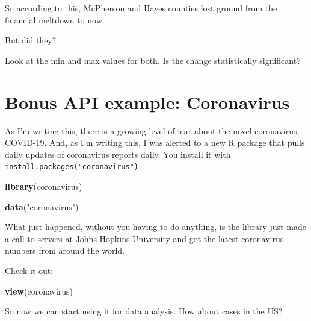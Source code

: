 \documentclass[]{book}
\newenvironment{Shaded}{\begin{snugshade}}{\end{snugshade}}
\newcommand{\KeywordTok}[1]{\textcolor[rgb]{0.13,0.29,0.53}{\textbf{#1}}}
\newcommand{\NormalTok}[1]{#1}
\newcommand{\OperatorTok}[1]{\textcolor[rgb]{0.81,0.36,0.00}{\textbf{#1}}}
\newcommand{\StringTok}[1]{\textcolor[rgb]{0.31,0.60,0.02}{#1}}
\begin{document}
So according to this, McPherson and Hayes counties lost ground from the financial meltdown to now.

But did they?

Look at the min and max values for both. Is the change statistically significant?

\hypertarget{bonus-api-example-coronavirus}{%
\section{Bonus API example: Coronavirus}\label{bonus-api-example-coronavirus}}

As I'm writing this, there is a growing level of fear about the novel coronavirus, COVID-19. And, as I'm writing this, I was alerted to a new R package that pulls daily updates of coronavirus reports daily. You install it with \texttt{install.packages("coronavirus")}

\begin{Shaded}
\begin{Highlighting}[]
\KeywordTok{library}\NormalTok{(coronavirus)}

\KeywordTok{data}\NormalTok{(}\StringTok{"coronavirus"}\NormalTok{) }
\end{Highlighting}
\end{Shaded}

What just happened, without you having to do anything, is the library just made a call to servers at Johns Hopkins University and got the latest coronavirus numbers from around the world.

Check it out:

\begin{Shaded}
\begin{Highlighting}[]
\KeywordTok{view}\NormalTok{(coronavirus)}
\end{Highlighting}
\end{Shaded}

So now we can start using it for data analysis. How about cases in the US?

\begin{Shaded}
\end{Shaded}
\end{document}
